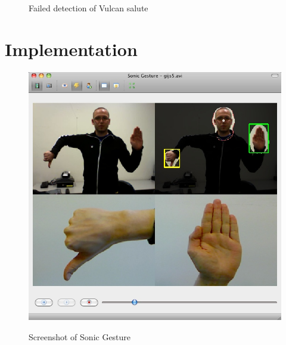 \begin{figure}[htbp]
\centering
{}
\hspace{0.09\linewidth}
\caption{Failed detection of Vulcan salute}
\label{fig:vulcanfail}
\end{figure}




\section{Implementation}
\label{sec:implementation}

\begin{figure}[ht]
\begin{center}
\label{fig:sonicgesture}
\includegraphics[width=0.6\linewidth]{figures/sonicgesture.jpg}
\end{center}
\caption{Screenshot of Sonic Gesture}
\end{figure}


